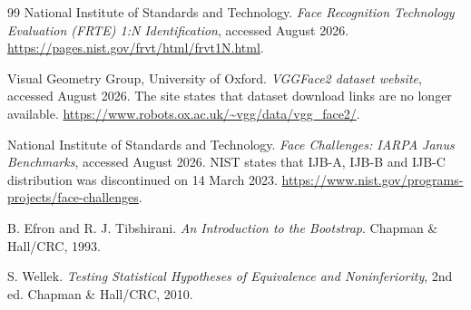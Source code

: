 \documentclass[10pt,a4paper]{article}
\begin{document}
\begin{thebibliography}{99}
National Institute of Standards and Technology.
\emph{Face Recognition Technology Evaluation (FRTE) 1:N Identification}, accessed August 2026.
\url{https://pages.nist.gov/frvt/html/frvt1N.html}.

Visual Geometry Group, University of Oxford.
\emph{VGGFace2 dataset website}, accessed August 2026. The site states that dataset download
links are no longer available.
\url{https://www.robots.ox.ac.uk/~vgg/data/vgg_face2/}.

National Institute of Standards and Technology.
\emph{Face Challenges: IARPA Janus Benchmarks}, accessed August 2026. NIST states that
IJB-A, IJB-B and IJB-C distribution was discontinued on 14 March 2023.
\url{https://www.nist.gov/programs-projects/face-challenges}.

B. Efron and R. J. Tibshirani.
\emph{An Introduction to the Bootstrap}. Chapman \& Hall/CRC, 1993.

S. Wellek.
\emph{Testing Statistical Hypotheses of Equivalence and Noninferiority}, 2nd ed.
Chapman \& Hall/CRC, 2010.

\end{thebibliography}
\end{document}
